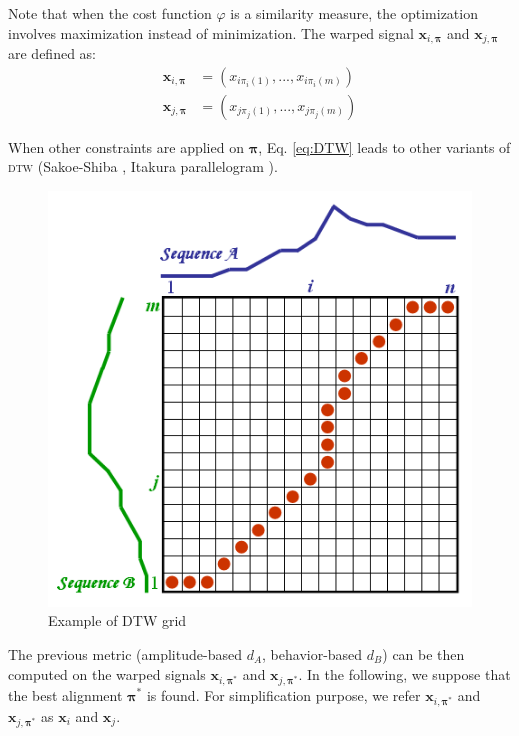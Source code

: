 \noindent Note that when the cost function $\varphi$ is a similarity measure, the optimization involves maximization instead of minimization. The warped signal $\textbf{x}_{i,\boldsymbol{\pi}}$ and $\textbf{x}_{j,\boldsymbol{\pi}}$ are defined as:
\begin{align*}
\textbf{x}_{i,\boldsymbol{\pi}} 
&= (x_{i\pi_i(1)}, ..., 
x_{i\pi_i(m)}) 			\\	
\textbf{x}_{j,\boldsymbol{\pi}} 
&= (x_{j\pi_j(1)}, ..., 
x_{j\pi_j(m)}) 	
\end{align*}

\noindent When other constraints are applied on $\boldsymbol{\pi}$, Eq. \eqref{eq:DTW} leads to other variants of \textsc{dtw} (Sakoe-Shiba \cite{Sakoe1978a}, Itakura parallelogram \cite{Rabiner1993}).

\begin{figure}[h!]
	\centering
	\includegraphics[width=0.4\linewidth]{images/DTWgrid}
	\caption{Example of DTW grid}
	\label{fig:DTWgrid}
\end{figure}


The previous metric (amplitude-based $d_A$, behavior-based $d_B$) can be then computed on the warped signals $\textbf{x}_{i,\boldsymbol{\pi}^*}$ and $\textbf{x}_{j,\boldsymbol{\pi}^*}$. In the following, we suppose that the best alignment $\boldsymbol{\pi}^*$ is found. For simplification purpose, we refer $\textbf{x}_{i,\boldsymbol{\pi}^*}$ and $\textbf{x}_{j,\boldsymbol{\pi}^*}$ as $\textbf{x}_{i}$ and $\textbf{x}_{j}$. 





